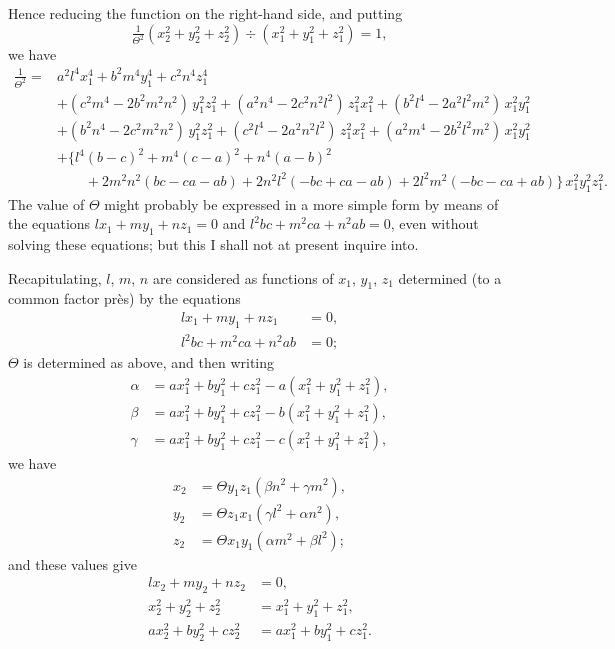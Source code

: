 \documentclass[11pt,a4paper]{article}
\begin{document}
\medskip

Hence reducing the function on the right-hand side, and putting
\[
\tfrac{1}{\Theta^2}(x_2^2 + y_2^2 + z_2^2) \div (x_1^2 + y_1^2 + z_1^2) = 1,
\]
we have
\begin{align*}
\tfrac{1}{\Theta^2} ={}& a^2 l^4 x_1^4 + b^2 m^4 y_1^4 + c^2 n^4 z_1^4\\
&+ (c^2 m^4 - 2 b^2 m^2 n^2)\,y_1^2 z_1^2 + (a^2 n^4 - 2 c^2 n^2 l^2)\,z_1^2 x_1^2 + (b^2 l^4 - 2 a^2 l^2 m^2)\,x_1^2 y_1^2\\
&+ (b^2 n^4 - 2 c^2 m^2 n^2)\,y_1^2 z_1^2 + (c^2 l^4 - 2 a^2 n^2 l^2)\,z_1^2 x_1^2 + (a^2 m^4 - 2 b^2 l^2 m^2)\,x_1^2 y_1^2\\
&+ \bigl\{l^4 (b-c)^2 + m^4 (c-a)^2 + n^4 (a-b)^2\\
&\qquad + 2 m^2 n^2 (bc - ca - ab) + 2 n^2 l^2 (-bc + ca - ab) + 2 l^2 m^2 (-bc - ca + ab)\bigr\}\,x_1^2 y_1^2 z_1^2.
\end{align*}
The value of $\Theta$ might probably be expressed in a more simple form by means of the equations $l x_1 + m y_1 + n z_1 = 0$ and $l^2 bc + m^2 ca + n^2 ab = 0$, even without solving these equations; but this I shall not at present inquire into.

\medskip

Recapitulating, $l$, $m$, $n$ are considered as functions of $x_1$, $y_1$, $z_1$ determined (to a common factor pr\`es) by the equations
\begin{align*}
l x_1 + m y_1 + n z_1 &= 0,\\
l^2 bc + m^2 ca + n^2 ab &= 0;
\end{align*}
$\Theta$ is determined as above, and then writing
\begin{align*}
\alpha &= a x_1^2 + b y_1^2 + c z_1^2 - a(x_1^2 + y_1^2 + z_1^2),\\
\beta &= a x_1^2 + b y_1^2 + c z_1^2 - b(x_1^2 + y_1^2 + z_1^2),\\
\gamma &= a x_1^2 + b y_1^2 + c z_1^2 - c(x_1^2 + y_1^2 + z_1^2),
\end{align*}
we have
\begin{align*}
x_2 &= \Theta y_1 z_1 (\beta n^2 + \gamma m^2),\\
y_2 &= \Theta z_1 x_1 (\gamma l^2 + \alpha n^2),\\
z_2 &= \Theta x_1 y_1 (\alpha m^2 + \beta l^2);
\end{align*}
and these values give
\begin{align*}
l x_2 + m y_2 + n z_2 &= 0,\\
x_2^2 + y_2^2 + z_2^2 &= x_1^2 + y_1^2 + z_1^2,\\
a x_2^2 + b y_2^2 + c z_2^2 &= a x_1^2 + b y_1^2 + c z_1^2.
\end{align*}
\end{document}
